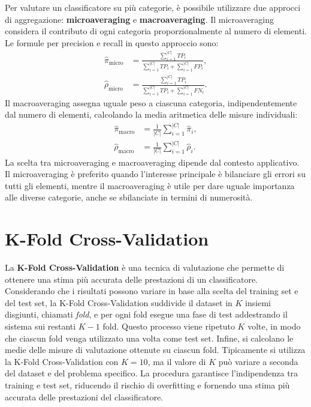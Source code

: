\documentclass{report}
\begin{document}
	Per valutare un classificatore su più categorie, è possibile utilizzare due approcci di aggregazione: \textbf{microaveraging} e \textbf{macroaveraging}. Il microaveraging considera il contributo di ogni categoria proporzionalmente al numero di elementi. Le formule per precision e recall in questo approccio sono:
	\begin{align*}
		\hat{\pi}_{\text{micro}} &= \frac{\sum_{i=1}^{|C|} TP_i}{\sum_{i=1}^{|C|} TP_i + \sum_{i=1}^{|C|} FP_i}, \\
		\hat{\rho}_{\text{micro}} &= \frac{\sum_{i=1}^{|C|} TP_i}{\sum_{i=1}^{|C|} TP_i + \sum_{i=1}^{|C|} FN_i}.
	\end{align*}
	Il macroaveraging assegna uguale peso a ciascuna categoria, indipendentemente dal numero di elementi, calcolando la media aritmetica delle misure individuali:
	\begin{align*}
		\hat{\pi}_{\text{macro}} &= \frac{1}{|C|} \sum_{i=1}^{|C|} \hat{\pi}_i, \\
		\hat{\rho}_{\text{macro}} &= \frac{1}{|C|} \sum_{i=1}^{|C|} \hat{\rho}_i.
	\end{align*}
	La scelta tra microaveraging e macroaveraging dipende dal contesto applicativo. Il microaveraging è preferito quando l'interesse principale è bilanciare gli errori su tutti gli elementi, mentre il macroaveraging è utile per dare uguale importanza alle diverse categorie, anche se sbilanciate in termini di numerosità.

	\section{K-Fold Cross-Validation}
	La \textbf{K-Fold Cross-Validation} è una tecnica di valutazione che permette di ottenere una stima più accurata delle prestazioni di un classificatore. Considerando che i risultati possono variare in base alla scelta del training set e del test set, la K-Fold Cross-Validation suddivide il dataset in $K$ insiemi disgiunti, chiamati \textit{fold}, e per ogni fold esegue una fase di test addestrando il sistema sui restanti $K-1$ fold. Questo processo viene ripetuto $K$ volte, in modo che ciascun fold venga utilizzato una volta come test set. Infine, si calcolano le medie delle misure di valutazione ottenute su ciascun fold. Tipicamente si utilizza la K-Fold Cross-Validation con $K=10$, ma il valore di $K$ può variare a seconda del dataset e del problema specifico. La procedura garantisce l'indipendenza tra training e test set, riducendo il rischio di overfitting e fornendo una stima più accurata delle prestazioni del classificatore.
\end{document}
